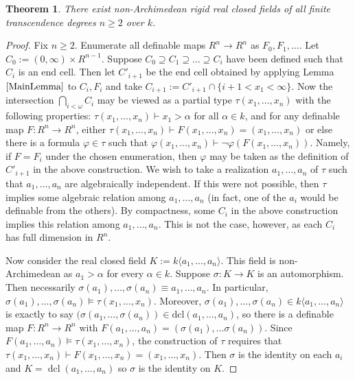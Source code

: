\documentclass{article}
\DeclareMathOperator{\dcl}{dcl}
\newtheorem{theorem}{Theorem}[section]
\theoremstyle{remark}
\theoremstyle{definition}
\theoremstyle{definition}
\theoremstyle{definition}
\theoremstyle{definition}
\begin{document}
\begin{theorem}\label{FiniteThm}
    There exist non-Archimedean rigid real closed fields of all finite transcendence degrees $n\geq 2$ over $k$.
\end{theorem}
\begin{proof}
    Fix $n\geq 2$. Enumerate all definable maps $R^n\to R^n$ as $F_0,F_1,\dots$. Let $C_0:=(0,\infty)\times R^{n-1}$. Suppose $C_0\supseteq C_1\supseteq\dots\supseteq C_i$ have been defined such that $C_i$ is an end cell. Then let $C'_{i+1}$ be the end cell obtained by applying Lemma $\ref{MainLemma}$ to $C_i, F_i$ and take $C_{i+1}:=C'_{i+1}\cap \{i+1<x_1<\infty\}$. Now the intersection $\bigcap_{i<\omega} C_i$ may be viewed as a partial type $\tau(x_1,\dots,x_n)$ with the following properties: $\tau(x_1,\dots,x_n)\vdash x_1>\alpha$ for all $\alpha\in k$, and for any definable map $F:R^n\to R^n$, either $\tau(x_1,\dots,x_n)\vdash F(x_1,\dots,x_n)= (x_1,\dots,x_n)$ or else there is a formula $\varphi\in \tau$ such that $\varphi(x_1,\dots,x_n)\vdash \lnot\varphi(F(x_1,\dots,x_n))$. Namely, if $F=F_i$ under the chosen enumeration, then $\varphi$ may be taken as the definition of $C'_{i+1}$ in the above construction. We wish to take a realization $a_1,\dots,a_n$ of $\tau$ such that $a_1,\dots,a_n$ are algebraically independent. If this were not possible, then $\tau$ implies some algebraic relation among $a_1,\dots,a_n$ (in fact, one of the $a_i$ would be definable from the others). By compactness, some $C_i$ in the above construction implies this relation among $a_1,\dots,a_n$. This is not the case, however, as each $C_i$ has full dimension in $R^n$.
    
    Now consider the real closed field $K:=k\langle a_1,\dots,a_n\rangle$. This field is non-Archimedean as $a_1>\alpha$ for every $\alpha\in k$. Suppose $\sigma:K\to K$ is an automorphism. Then necessarily $\sigma(a_1),\dots,\sigma(a_n)\equiv a_1,\dots,a_n$. In particular, $\sigma(a_1),\dots,\sigma(a_n)\models \tau(x_1,\dots,x_n)$. Moreover, $\sigma(a_1),\dots,\sigma(a_n)\in k\langle a_1,\dots,a_n\rangle$ is exactly to say $(\sigma(a_1,\dots,\sigma(a_n))\in\text{dcl}(a_1,\dots,a_n)$, so there is a definable map $F:R^n\to R^n$ with $F(a_1,\dots,a_n)= (\sigma(a_1),\dots\sigma(a_n))$. Since $F(a_1,\dots,a_n)\models \tau(x_1,\dots,x_n)$, the construction of $\tau$ requires that $\tau(x_1,\dots,x_n)\vdash F(x_1,\dots,x_n)=(x_1,\dots,x_n)$. Then $\sigma$ is the identity on each $a_i$ and $K=\dcl(a_1,\dots,a_n)$ so $\sigma$ is the identity on $K$.
    
    
    
\end{proof}
\end{document}
